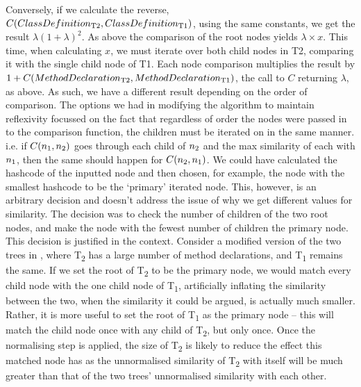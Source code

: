 Conversely, if we calculate the reverse, 
$C(ClassDefinition\textsubscript{T2}, ClassDefinition\textsubscript{T1})$, using the same constants, we get the result $\lambda(1+\lambda)^2$. As above the comparison of the root nodes yields $\lambda \times x$. This time, when calculating $x$, we must
iterate over both child nodes in T2, comparing it with the single child node of
T1. Each node comparison multiplies the result by $1+C(MethodDeclaration\textsubscript{T2},MethodDeclaration\textsubscript{T1})$, the call to $C$ returning $\lambda$, as above. As such, we have a different result depending on the order of comparison.
The options we had in modifying the algorithm to maintain reflexivity
focussed on the fact that regardless of order the nodes were passed in to the comparison function, the children must be iterated on in the same manner. 
i.e. if $C(n\textsubscript{1},n\textsubscript{2})$ goes through each child of $n\textsubscript{2}$ and the max similarity of each with $n\textsubscript{1}$, then the same should happen for
$C(n\textsubscript{2},n\textsubscript{1})$. We could have calculated the hashcode of the inputted node and then chosen, for example, the node with the smallest hashcode to be the `primary' iterated node. This, however, is an arbitrary decision and doesn’t address the issue of why we get different values for similarity. The decision was to check the number of children of the two root nodes, and make the node with the fewest number of children the primary node.
This decision is justified in the context. Consider a modified version of the two trees in 
, where T\textsubscript{2} has a large number of method declarations,  and T\textsubscript{1} remains the same. If we set the
root of T\textsubscript{2} to be the primary node, we would match every child node with the one child node of T\textsubscript{1}, artificially inflating the similarity between the two, when the similarity it could be argued, is actually much smaller. Rather, it is more useful to set the root of T\textsubscript{1} as the primary node -- this will match the child node once with any child of T\textsubscript{2}, but only once. Once the normalising step is applied, the size of 
T\textsubscript{2} is likely to reduce the effect this matched node has as the unnormalised similarity of T\textsubscript{2} with itself will be much greater than that of the two trees’ unnormalised similarity with each other. 

